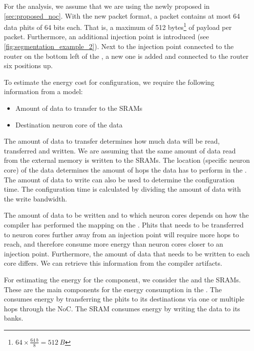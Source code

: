 For the analysis, we assume that we are using the newly proposed \confignoc{} in \cref{sec:proposed_noc}. 
With the new packet format, a packet contains at most 64 data phits of 64 bits each.
That is, a maximum of 512 bytes\footnote{$64 \times \frac{\SI{64}{b}}{8} = \SI{512}{B}$} of payload per packet.
Furthermore, an additional injection point is introduced (see \cref{fig:segmentation_example_2}).
Next to the injection point connected to the router on the bottom left of the \confignoc{}, a new one is added and connected to the router six positions up.

To estimate the energy cost for configuration, we require the following information from a model:
\begin{itemize}
    \item Amount of data to transfer to the SRAMs
    \item Destination neuron core of the data
\end{itemize}

The amount of data to transfer determines how much data will be read, transferred and written.
We are assuming that the same amount of data read from the external memory is written to the SRAMs.
The location (specific neuron core) of the data determines the amount of hops the data has to perform in the \confignoc{}.
The amount of data to write can also be used to determine the configuration time.
The configuration time is calculated by dividing the amount of data with the write bandwidth.

The amount of data to be written and to which neuron cores depends on how the compiler has performed the mapping on the \graicore{}. %
Phits that needs to be transferred to neuron cores further away from an injection point will require more hops to reach, and therefore consume more energy than neuron cores closer to an injection point.
Furthermore, the amount of data that needs to be written to each core differs.
We can retrieve this information from the compiler artifacts.

For estimating the energy for the \graicore{} component, we consider the \confignoc{} and the SRAMs.
These are the main components for the energy consumption in the \graicore{}.
The \confignoc{} consumes energy by transferring the phits to its destinations via one or multiple hops through the NoC.
The SRAM consumes energy by writing the data to its banks.

